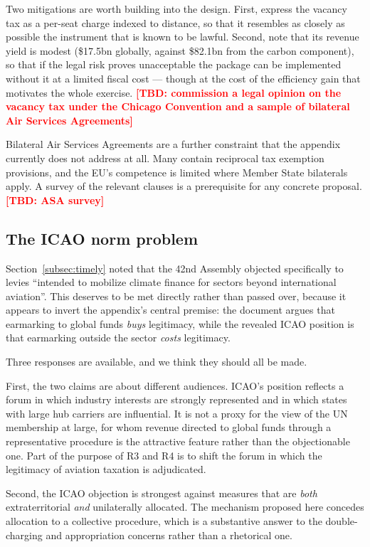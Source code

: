 \documentclass[11pt]{article}
\newcommand{\tbd}[1]{\textcolor{red}{\textbf{[TBD: #1]}}}
\begin{document}
Two mitigations are worth building into the design. First, express the vacancy
tax as a per-seat charge indexed to distance, so that it resembles as closely as
possible the instrument that is known to be lawful. Second, note that its
revenue yield is modest (\$17.5bn globally, against \$82.1bn from the carbon
component), so that if the legal risk proves unacceptable the package can be
implemented without it at a limited fiscal cost --- though at the cost of the
efficiency gain that motivates the whole exercise.
\tbd{commission a legal opinion on the vacancy tax under the Chicago Convention
and a sample of bilateral Air Services Agreements}

Bilateral Air Services Agreements are a further constraint that the appendix
currently does not address at all. Many contain reciprocal tax exemption
provisions, and the EU's competence is limited where Member State bilaterals
apply. A survey of the relevant clauses is a prerequisite for any concrete
proposal. \tbd{ASA survey}

\subsection{The ICAO norm problem}

Section~\ref{subsec:timely} noted that the 42nd Assembly objected specifically to
levies ``intended to mobilize climate finance for sectors beyond international
aviation''. This deserves to be met directly rather than passed over, because it
appears to invert the appendix's central premise: the document argues that
earmarking to global funds \emph{buys} legitimacy, while the revealed ICAO
position is that earmarking outside the sector \emph{costs} legitimacy.

Three responses are available, and we think they should all be made.

First, the two claims are about different audiences. ICAO's position reflects a
forum in which industry interests are strongly represented and in which states
with large hub carriers are influential. It is not a proxy for the view of the
UN membership at large, for whom revenue directed to global funds through a
representative procedure is the attractive feature rather than the objectionable
one. Part of the purpose of R3 and R4 is to shift the forum in which the
legitimacy of aviation taxation is adjudicated.

Second, the ICAO objection is strongest against measures that are
\emph{both} extraterritorial \emph{and} unilaterally allocated. The mechanism
proposed here concedes allocation to a collective procedure, which is a
substantive answer to the double-charging and appropriation concerns rather than
a rhetorical one.
\end{document}
